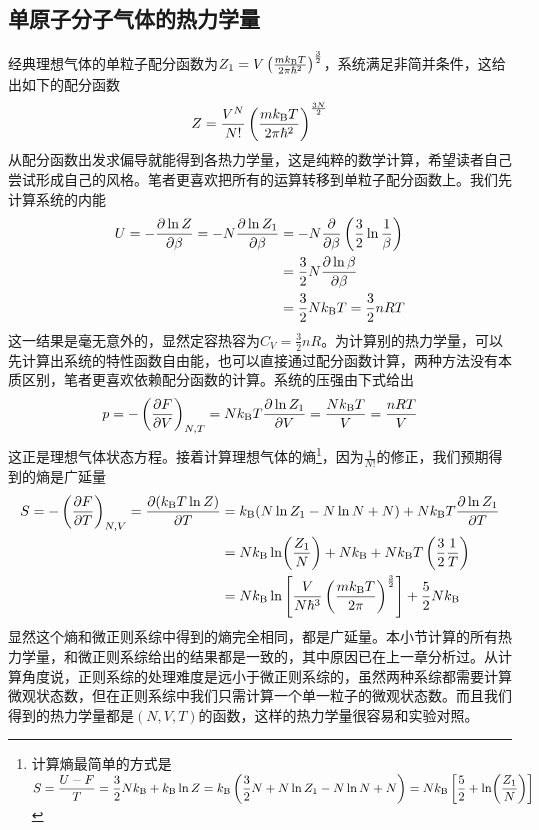 \documentclass[../../main.tex]{subfiles}
\begin{document}
\subsection{单原子分子气体的热力学量}
经典理想气体的单粒子配分函数为\(Z_1=V\left(\frac{mk_{\mathrm{B}} T}{2\pi\hbar^2}\right)^{\frac{3}{2}}\)，系统满足非简并条件，这给出如下的配分函数
\begin{equation}
    Z=\frac{V^N}{N!}\left(\frac{mk_{\mathrm{B}} T}{2\pi\hbar^2}\right)^{\frac{3N}{2}}
\end{equation}
从配分函数出发求偏导就能得到各热力学量，这是纯粹的数学计算，希望读者自己尝试形成自己的风格。笔者更喜欢把所有的运算转移到单粒子配分函数上。我们先计算系统的内能
\begin{equation}
    \begin{split}
        U=-\pdv{\ln Z}{\beta}=-N\pdv{\ln Z_1}{\beta}&=-N\pdv{\beta}\left(\frac{3}{2}\ln\frac{1}{\beta}\right) \\
        &=\frac{3}{2}N\pdv{\ln\beta}{\beta} \\
        &=\frac{3}{2}Nk_{\mathrm{B}} T=\frac{3}{2}nRT
    \end{split}
\end{equation}
这一结果是毫无意外的，显然定容热容为\(C_V=\frac{3}{2}nR\)。为计算别的热力学量，可以先计算出系统的特性函数自由能，也可以直接通过配分函数计算，两种方法没有本质区别，笔者更喜欢依赖配分函数的计算。系统的压强由下式给出
\begin{equation}
    p=-\left(\pdv{F}{V}\right)_{N,T}=Nk_{\mathrm{B}} T\pdv{\ln Z_1}{V}=\frac{Nk_{\mathrm{B}} T}{V}=\frac{nRT}{V}
\end{equation}
这正是理想气体状态方程。接着计算理想气体的熵\footnote{计算熵最简单的方式是\(\displaystyle S=\frac{U-F}{T}=\frac{3}{2}Nk_{\mathrm{B}}+k_{\mathrm{B}}\ln Z=k_{\mathrm{B}}\left(\frac{3}{2}N+N\ln Z_1-N\ln N+N\right)=Nk_{\mathrm{B}}\left[\frac{5}{2}+\ln(\frac{Z_1}{N})\right]\)}，因为\(\frac{1}{N!}\)的修正，我们预期得到的熵是广延量
\begin{equation}
    \begin{split}
        S=-\left(\pdv{F}{T}\right)_{N,V}=\pdv{(k_{\mathrm{B}}T\ln Z)}{T}&=k_{\mathrm{B}}(N\ln Z_1-N\ln N+N)+Nk_{\mathrm{B}} T\pdv{\ln Z_1}{T} \\
        &=Nk_{\mathrm{B}}\ln(\frac{Z_1}{N})+Nk_{\mathrm{B}}+Nk_{\mathrm{B}} T\left(\frac{3}{2}\frac{1}{T}\right) \\
        &=Nk_{\mathrm{B}}\ln\left[\frac{V}{N\hbar^3}\left(\frac{mk_{\mathrm{B}} T}{2\pi}\right)^{\frac{3}{2}}\right]+\frac{5}{2}Nk_{\mathrm{B}}
    \end{split}
\end{equation}
显然这个熵和微正则系综中得到的熵完全相同，都是广延量。本小节计算的所有热力学量，和微正则系综给出的结果都是一致的，其中原因已在上一章分析过。从计算角度说，正则系综的处理难度是远小于微正则系综的，虽然两种系综都需要计算微观状态数，但在正则系综中我们只需计算一个单一粒子的微观状态数。而且我们得到的热力学量都是\((N,V,T)\)的函数，这样的热力学量很容易和实验对照。
\end{document}

